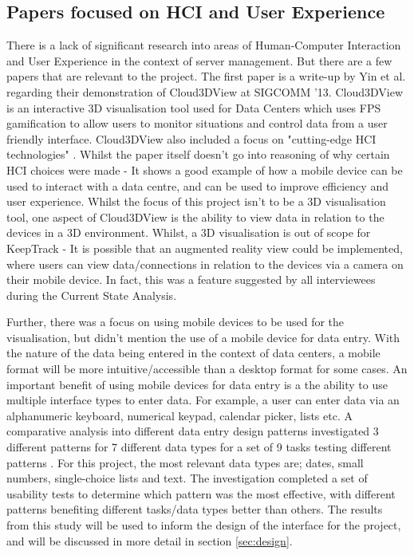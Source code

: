 \documentclass [11pt,a4paper]{article}
\begin{document}
\subsection{Papers focused on HCI and User Experience}
\label{sec:HCI}
There is a lack of significant research into areas of Human-Computer Interaction and User Experience in the context of server management. But there are a few papers that are relevant to the project. The first paper is a write-up by Yin et al. \cite{cloud3dview} regarding their demonstration of Cloud3DView at SIGCOMM '13. Cloud3DView is an interactive 3D visualisation tool used for Data Centers which uses FPS gamification to allow users to monitor situations and control data from a user friendly interface. Cloud3DView also included a focus on "cutting-edge HCI technologies" \cite{cloud3dview}. Whilst the paper itself doesn't go into reasoning of why certain HCI choices were made - It shows a good example of how a mobile device can be used to interact with a data centre, and can be used to improve efficiency and user experience. Whilst the focus of this project isn't to be a 3D visualisation tool, one aspect of Cloud3DView is the ability to view data in relation to the devices in a 3D environment. Whilst, a 3D visualisation is out of scope for KeepTrack - It is possible that an augmented reality view could be implemented, where users can view data/connections in relation to the devices via a camera on their mobile device. In fact, this was a feature suggested by all interviewees during the Current State Analysis.

Further, there was a focus on using mobile devices to be used for the visualisation, but didn't mention the use of a mobile device for data entry. With the nature of the data being entered in the context of data centers, a mobile format will be more intuitive/accessible than a desktop format for some cases. An important benefit of using mobile devices for data entry is a the ability to use multiple interface types to enter data. For example, a user can enter data via an alphanumeric keyboard, numerical keypad, calendar picker, lists etc. A comparative analysis into different data entry design patterns investigated 3 different patterns for 7 different data types for a set of 9 tasks testing different patterns \cite{myka2019comparative}. For this project, the most relevant data types are; dates, small numbers, single-choice lists and text. The investigation completed a set of usability tests to determine which pattern was the most effective, with different patterns benefiting different tasks/data types better than others. The results from this study will be used to inform the design of the interface for the project, and will be discussed in more detail in section \ref{sec:design}. 
\end{document}
